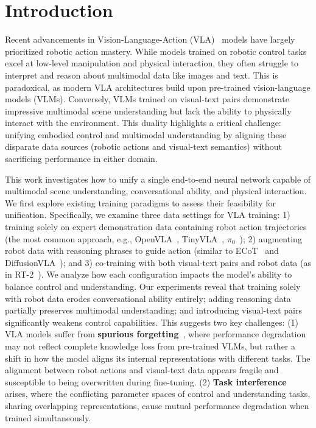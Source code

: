 \section{Introduction}
Recent advancements in Vision-Language-Action (VLA)~\cite{[pi0, kim24openvla, wen2024tinyvla, wen2025dexvla} models have largely prioritized robotic action mastery. While models trained on robotic control tasks excel at low-level manipulation and physical interaction, they often struggle to interpret and reason about multimodal data like images and text. This is paradoxical, as modern VLA architectures build upon pre-trained vision-language models (VLMs). Conversely, VLMs trained on visual-text pairs demonstrate impressive multimodal scene understanding but lack the ability to physically interact with the environment. This duality highlights a critical challenge: unifying embodied control and multimodal understanding by aligning these disparate data sources (robotic actions and visual-text semantics) without sacrificing performance in either domain.

This work investigates how to unify a single end-to-end neural network capable of multimodal scene understanding, conversational ability, and physical interaction. We first explore existing training paradigms to assess their feasibility for unification. Specifically, we examine three data settings for VLA training: 1) training solely on expert demonstration data containing robot action trajectories (the most common approach, e.g., OpenVLA~\cite{kim24openvla}, TinyVLA~\cite{wen2024tinyvla}, $\pi_0$~\cite{[pi0}); 2) augmenting robot data with reasoning phrases to guide action (similar to ECoT~\cite{ecot} and DiffusionVLA~\cite{diffusionvla}); and 3) co-training with both visual-text pairs and robot data (as in RT-2~\cite{rt-2}). We analyze how each configuration impacts the model's ability to balance control and understanding. Our experiments reveal that training solely with robot data erodes conversational ability entirely; adding reasoning data partially preserves multimodal understanding; and introducing visual-text pairs significantly weakens control capabilities.  This suggests two key challenges: (1) VLA models suffer from \textbf{spurious forgetting}~\cite{zheng2025spurious, zhai2023investigating, luo2023empirical}, where performance degradation may not reflect complete knowledge loss from pre-trained VLMs, but rather a shift in how the model aligns its internal representations with different tasks. The alignment between robot actions and visual-text data appears fragile and susceptible to being overwritten during fine-tuning. (2) \textbf{Task interference}~\cite{wang2021afec,ahn2025prevalence} arises, where the conflicting parameter spaces of control and understanding tasks, sharing overlapping representations, cause mutual performance degradation when trained simultaneously. 

